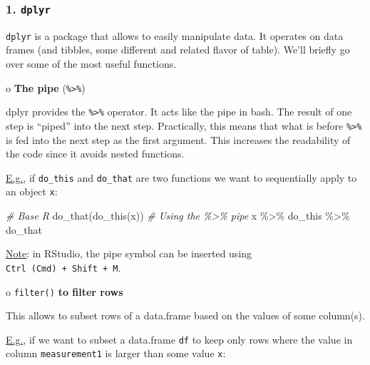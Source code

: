 \documentclass[
]{article}
\newenvironment{Shaded}{\begin{snugshade}}{\end{snugshade}}
\newcommand{\CommentTok}[1]{\textcolor[rgb]{0.56,0.35,0.01}{\textit{#1}}}
\newcommand{\FunctionTok}[1]{\textcolor[rgb]{0.00,0.00,0.00}{#1}}
\newcommand{\NormalTok}[1]{#1}
\newcommand{\SpecialCharTok}[1]{\textcolor[rgb]{0.00,0.00,0.00}{#1}}
\begin{document}
\hypertarget{dplyr}{%
\subsubsection{\texorpdfstring{1.
\texttt{dplyr}}{1. dplyr}}\label{dplyr}}

\texttt{dplyr} is a package that allows to easily manipulate data. It
operates on data frames (and tibbles, some different and related flavor
of table). We'll briefly go over some of the most useful functions.

o \textbf{The pipe} (\texttt{\%\textgreater{}\%})

dplyr provides the \texttt{\%\textgreater{}\%} operator. It acts like
the \texttt{\textbar{}} pipe in bash. The result of one step is
``piped'' into the next step. Practically, this means that what is
before \texttt{\%\textgreater{}\%} is fed into the next step as the
first argument. This increases the readability of the code since it
avoids nested functions.

\underline{E.g.}, if \texttt{do\_this} and \texttt{do\_that} are two
functions we want to sequentially apply to an object \texttt{x}:

\begin{Shaded}
\begin{Highlighting}[]
\CommentTok{\# Base R}
\FunctionTok{do\_that}\NormalTok{(}\FunctionTok{do\_this}\NormalTok{(x))}
\CommentTok{\# Using the \%\textgreater{}\% pipe}
\NormalTok{x }\SpecialCharTok{\%\textgreater{}\%}\NormalTok{ do\_this }\SpecialCharTok{\%\textgreater{}\%}\NormalTok{ do\_that}
\end{Highlighting}
\end{Shaded}

\underline{Note}: in RStudio, the pipe symbol can be inserted using
\texttt{Ctrl\ (Cmd)\ +\ Shift\ +\ M}.

o \texttt{filter()} \textbf{to filter rows}

This allows to subset rows of a data.frame based on the values of some
column(s).

\underline{E.g.}, if we want to subset a data.frame \texttt{df} to keep
only rows where the value in column \texttt{measurement1} is larger than
some value \texttt{x}:

\begin{Shaded}
\end{Shaded}
\end{document}
